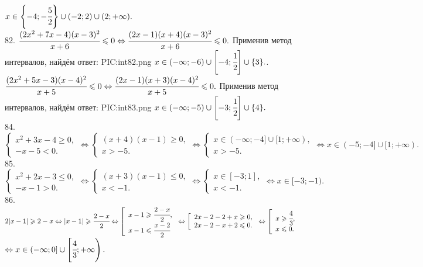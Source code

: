 $x\in\left\{-4;-\cfrac{5}{2}\right\}\cup(-2;2)\cup(2;+\infty).$\\
82. $\cfrac{(2x^2+7x-4)(x-3)^2}{x+6}\leqslant0\Leftrightarrow\cfrac{(2x-1)(x+4)(x-3)^2}{x+6}\leqslant0.$
Применив метод интервалов, найдём ответ:
{{PIC:int82.png}}
$x\in(-\infty;-6)\cup\left[-4;\cfrac{1}{2}\right]\cup\{3\}.$\newpage{}. $\cfrac{(2x^2+5x-3)(x-4)^2}{x+5}\leqslant0\Leftrightarrow\cfrac{(2x-1)(x+3)(x-4)^2}{x+5}\leqslant0.$
Применив метод интервалов, найдём ответ:
{{PIC:int83.png}}
$x\in(-\infty;-5)\cup\left[-3;\cfrac{1}{2}\right]\cup\{4\}.$\\
84. $\begin{cases} x^2+3x-4\geqslant0,\\ -x-5<0.\end{cases}\Leftrightarrow \begin{cases} (x+4)(x-1)\geqslant0,\\ x>-5.\end{cases}
\Leftrightarrow \begin{cases} x\in(-\infty;-4]\cup[1;+\infty),\\ x>-5.\end{cases}\Leftrightarrow x\in(-5;-4]\cup[1;+\infty).$\\
85. $\begin{cases} x^2+2x-3\leqslant0,\\ -x-1>0.\end{cases} \Leftrightarrow\begin{cases} (x+3)(x-1)\leqslant0,\\ x<-1.\end{cases}
\Leftrightarrow\begin{cases} x\in[-3;1],\\ x<-1.\end{cases}\Leftrightarrow x\in[-3;-1).$\\
86. $2|x-1|\geqslant 2-x\Leftrightarrow |x-1|\geqslant \cfrac{2-x}{2} \Leftrightarrow \left[\begin{array}{l} x-1\geqslant \cfrac{2-x}{2},\\
x-1\leqslant \cfrac{x-2}{2}\end{array}\right. \Leftrightarrow \left[\begin{array}{l} 2x-2-2+x\geqslant 0,\\
2x-2-x+2\leqslant 0.\end{array}\right. \Leftrightarrow \left[\begin{array}{l} x\geqslant \cfrac{4}{3},\\
x\leqslant 0.\end{array}\right. $\\$\Leftrightarrow x\in(-\infty;0]\cup\left[\cfrac{4}{3};+\infty\right).$\\
